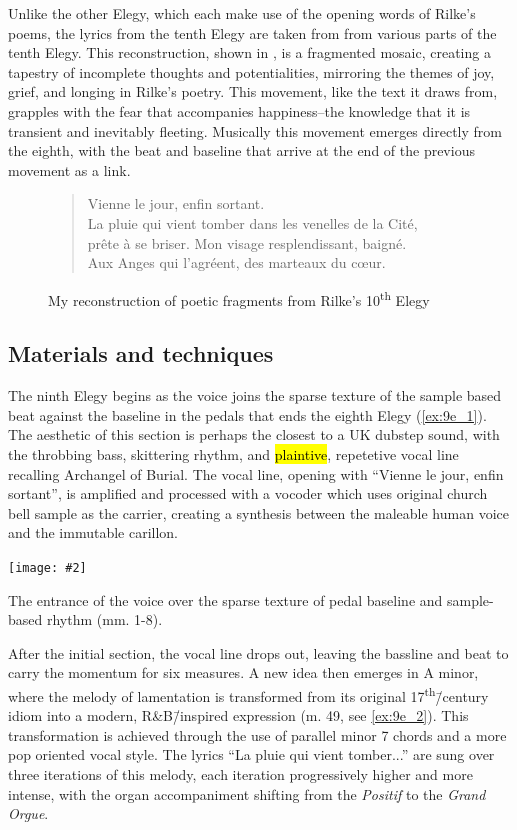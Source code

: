 \documentclass[12pt,twoside,maitrise]{dms_ks}
\newcommand{\customincludeexamples}[4][]{%
    \begin{example}[H]
        \centering
        \texttt{[image: \#2]}
        \caption{#4}
	\label{#3} 
    \end{example}
}
\theoremstyle{definition}
\begin{document}
{{Unlike the other Elegy, which each make use of the opening words of Rilke's poems, the lyrics from the tenth Elegy are taken from from various parts of the tenth Elegy. 
This reconstruction, shown in , is a fragmented mosaic, creating a tapestry of incomplete thoughts and potentialities, mirroring the themes of joy, grief, and longing in Rilke’s poetry. 
This movement, like the text it draws from, grapples with the fear that accompanies happiness--the knowledge that it is transient and inevitably fleeting. 
Musically this movement emerges directly from the eighth, with the beat and baseline that arrive at the end of the previous movement as a link.

\begin{figure}[H]
\begin{verse}
Vienne le jour, enfin sortant.\\ 
La pluie qui vient tomber dans les venelles de la Cité,\\ 
prête à se briser. Mon visage resplendissant, baigné.\\ 
Aux Anges qui l'agréent, des marteaux du cœur.\\
\end{verse}  
	\caption{My reconstruction of poetic fragments from Rilke's 10\textsuperscript{th} Elegy} 
\label{poem}
\end{figure}

\subsection{Materials and techniques}

The ninth Elegy begins as the voice joins the sparse texture of the sample based beat against the baseline in the pedals that ends the eighth Elegy (\cref{ex:9e_1}). 
The aesthetic of this section is perhaps the closest to a UK dubstep sound, with the throbbing bass, skittering rhythm, and \hl{plaintive}, repetetive vocal line recalling Archangel of Burial. 
The vocal line, opening with “Vienne le jour, enfin sortant”, is amplified and processed with a vocoder which uses original church bell sample as the carrier, creating a synthesis between the maleable human voice and the immutable carillon.

\customincludeexamples[width=\textwidth]{9e_1}{ex:9e_1}{The entrance of the voice over the sparse texture of pedal baseline and sample-based rhythm (mm. 1-8).}

After the initial section, the vocal line drops out, leaving the bassline and beat to carry the momentum for six measures. 
A new idea then emerges in A minor, where the melody of lamentation is transformed from its original 17\textsuperscript{th}\=/century idiom into a modern, R\&B\=/inspired expression (m. 49, see \cref{ex:9e_2}). 
This transformation is achieved through the use of parallel minor 7 chords and a more pop oriented vocal style. 
The lyrics “La pluie qui vient tomber...” are sung over three iterations of this melody, each iteration progressively higher and more intense, with the organ accompaniment shifting from the \textit{Positif} to the \textit{Grand Orgue}.

}}
\end{document}
